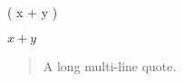 \left( x + y \right)

$ x + y $

\begin{quote}
    A
    long
    multi-line
    quote.
\end{quote}

